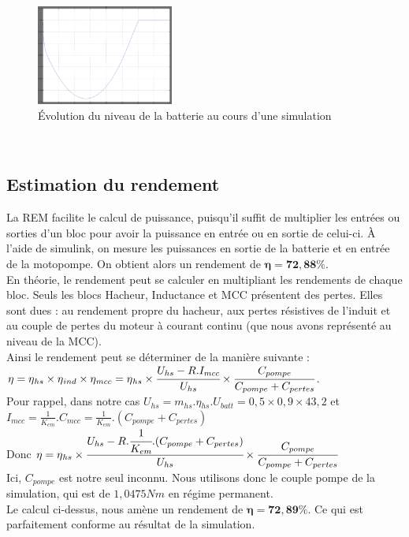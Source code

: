 \begin{figure}[ht]
	\begin{center}
	\includegraphics[width=0.4\textwidth]{images/Niveau_batt_inv.png}
	\caption{Évolution du niveau de la batterie au cours d'une simulation}\label{img:NivBatt}
	\end{center}
\end{figure}
\FloatBarrier 
\vspace{150px}~ 


\subsection{Estimation du rendement}
La REM facilite le calcul de puissance, puisqu'il suffit de multiplier les entrées ou sorties d'un bloc pour avoir la puissance en entrée ou en  sortie de celui-ci. À l'aide de simulink, on mesure les puissances en sortie de la batterie et en entrée de la motopompe. On obtient alors un rendement de $\mathbf{\eta = 72,88 \%}$.\\

En théorie, le rendement peut se calculer en multipliant les rendements de chaque bloc. Seuls les blocs Hacheur, Inductance et MCC présentent des pertes. Elles sont dues : au rendement propre du hacheur, aux pertes résistives de l'induit et au couple de pertes du moteur à courant continu (que nous avons représenté au niveau de la MCC).\\
Ainsi le rendement peut se déterminer de la manière suivante : \\
$\eta = \eta{}_{hs} \times \eta{}_{ind} \times \eta{}_{mcc} = \eta{}_{hs} \times \cfrac{U_{hs}-R.I_{mcc}}{U_{hs}} \times \cfrac{C_{pompe}}{C_{pompe}+C_{pertes}}$.\\
Pour rappel, dans notre cas $ U_{hs} = m_{hs}.\eta{}_{hs}.U_{batt} = 0,5\times0,9\times43,2 $ et $ I_{mcc} = \frac{1}{K_{em}}.C_{mcc} = \frac{1}{K_{em}}.(C_{pompe}+C_{pertes})$\\
Donc $\eta = \eta{}_{hs} \times \cfrac{U_{hs}-R.\cfrac{1}{K_{em}}.(C_{pompe}+C_{pertes})}{U_{hs}} \times \cfrac{C_{pompe}}{C_{pompe}+C_{pertes}}$\\

Ici, $C_{pompe}$ est notre seul inconnu. Nous utilisons donc le couple pompe de la simulation, qui est de $1,0475Nm$ en régime permanent.\\
Le calcul ci-dessus, nous amène un rendement de $\mathbf{\eta = 72,89 \%}$. Ce qui est parfaitement conforme au résultat de la simulation.\\